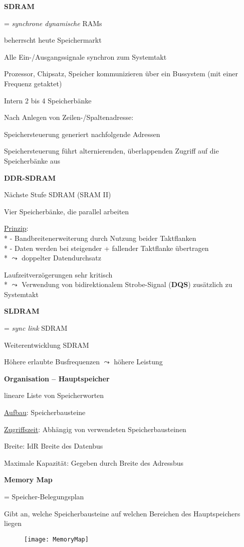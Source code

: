 \textbf{SDRAM}
\begin{items}
	\item = \emph{synchrone dynamische} RAMs
	\item beherrscht heute Speichermarkt
	\item Alle Ein-/Ausgangssignale synchron zum Systemtakt
	\item Prozessor, Chipsatz, Speicher kommunizieren über ein Bussystem (mit einer Frequenz getaktet)
	\item Intern 2 bis 4 Speicherbänke
	\item Nach Anlegen von Zeilen-/Spaltenadresse:
	\begin{enumeration}
		\item Speichersteuerung generiert nachfolgende Adressen
		\item Speichersteuerung führt alternierenden, überlappenden Zugriff auf die Speicherbänke aus
	\end{enumeration}
\end{items}

\textbf{DDR-SDRAM}
\begin{items}
	\item Nächste Stufe SDRAM (SRAM II)
	\item Vier Speicherbänke, die parallel arbeiten
	\item \underline{Prinzip}: \\*
	 	- Bandbreitenerweiterung durch Nutzung beider Taktflanken \\*
	 	- Daten werden bei steigender + fallender Taktflanke übertragen \\*
	 	\( \leadsto \) doppelter Datendurchsatz
	\item Laufzeitverzögerungen sehr kritisch \\*
		\( \leadsto \) Verwendung von bidirektionalem Strobe-Signal (\textbf{DQS}) zusätzlich zu Systemtakt
\end{items}

\textbf{SLDRAM}
\begin{items}
	\item = \emph{sync link} SDRAM
	\item Weiterentwicklung SDRAM
	\item Höhere erlaubte Busfrequenzen \( \leadsto \) höhere Leistung
\end{items}

\textbf{Organisation -- Hauptspeicher}
\begin{items}
	\item lineare Liste von Speicherworten
	\item \underline{Aufbau}: Speicherbausteine
	\item \underline{Zugriffszeit}: Abhängig von verwendeten Speicherbausteinen
	\item Breite: IdR Breite des Datenbus
	\item Maximale Kapazität: Gegeben durch Breite des Adressbus
\end{items}

\textbf{Memory Map}
\begin{items}
	\item = Speicher-Belegungsplan
	\item Gibt an, welche Speicherbausteine auf welchen Bereichen des Hauptspeichers liegen
\end{items}
\begin{figure}[H]\centering\label{MemoryMap}\texttt{[image: MemoryMap]}\end{figure}